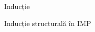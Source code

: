 \documentclass[xcolor=pdftex,romanian,colorlinks]{beamer}
\begin{document}
\begin{section}{Inducție}
\begin{subsection}{Inducție structurală în IMP}
\end{subsection}
%

\end{section}
\end{document}
